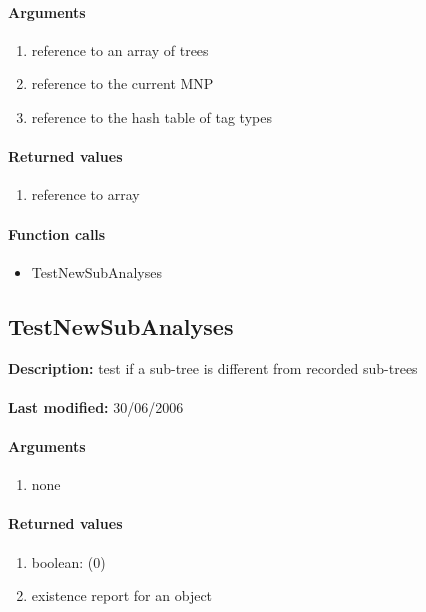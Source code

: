 \paragraph{Arguments}
\begin{enumerate}
\item reference to an array of trees
\item reference to the current MNP
\item reference to the hash table of tag types
\end{enumerate}

\paragraph{Returned values}
\begin{enumerate}
\item reference to array
\end{enumerate}

\paragraph{Function calls}
\begin{itemize}
\item TestNewSubAnalyses
\end{itemize}

\subsection{TestNewSubAnalyses}
\textbf{Description:} test if a sub-tree is different from recorded sub-trees\\
\\\textbf{Last modified:} 30/06/2006

\paragraph{Arguments}
\begin{enumerate}
\item none
\end{enumerate}

\paragraph{Returned values}
\begin{enumerate}
\item boolean: (0)
\item existence report for an object
\end{enumerate}

